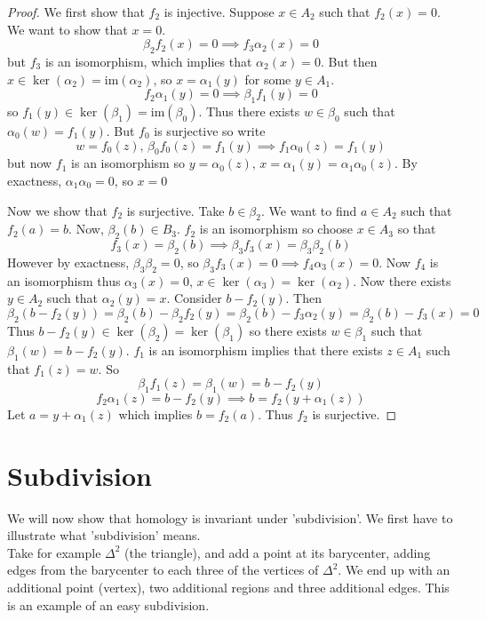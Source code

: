 \documentclass[a4paper,14pt]{extarticle}
\theoremstyle{definition}
\begin{document}
\begin{proof}
	We first show that $f_2$ is injective. Suppose $x\in A_2$ such
	that $f_2(x)=0$. We want to show that $x=0$.
	\[\beta_2 f_2(x)=0\implies f_3\alpha_2(x)=0\]
	but $f_3$ is an isomorphism, which implies that $\alpha_2(x)=0$.
	But then $x\in\ker(\alpha_2)=\text{im}(\alpha_2)$, so $x=\alpha_1(y)$
	for some $y\in A_1$. \[f_2\alpha_1(y)=0\implies \beta_1 f_1(y)=0\]
	so $f_1(y)\in\ker(\beta_1)=\text{im}(\beta_0)$.
	Thus there exists $w\in\beta_0$
	such that $\alpha_0(w)=f_1(y)$. But $f_0$ is surjective so write
	\[w=f_0(z), \,\beta_0 f_0(z)=f_1(y)\implies f_1\alpha_0(z)=f_1(y)\]
	but now $f_1$ is an isomorphism so $y=\alpha_0(z), \,x=\alpha_1(y)=
	\alpha_1\alpha_0(z)$. By exactness, $\alpha_1\alpha_0=0$, so $x=0$

	\vspace{12pt}

	Now we show that $f_2$ is surjective. Take $b\in\beta_2$. We want to find
	$a\in A_2$ such that $f_2(a)=b$. Now, $\beta_2(b)\in B_3$. $f_2$ is an 
	isomorphism so choose $x\in A_3$ so that \[f_3(x)=\beta_2(b)
	\implies \beta_3 f_3(x)=\beta_3\beta_2(b)\] However by exactness,
	$\beta_3\beta_2=0$, so $\beta_3f_3(x)=0\implies f_4\alpha_3(x)=0$.
	Now $f_4$ is an isomorphism thus $\alpha_3(x)=0$, $x\in\ker(\alpha_3)
	=\ker(\alpha_2)$. Now there exists $y\in A_2$ such that $\alpha_2(y)=x$.
	Consider $b-f_2(y)$. Then \[\beta_2(b-f_2(y))=\beta_2(b)-\beta_2f_2(y)
	=\beta_2(b)-f_3\alpha_2(y)=\beta_2(b)-f_3(x)=0\] Thus
	$b-f_2(y)\in\ker(\beta_2)=\ker(\beta_1)$ so there exists $w\in\beta_1$
	such that $\beta_1(w)=b-f_2(y)$. $f_1$ is an isomorphism implies that
	there exists $z\in A_1$ such that $f_1(z)=w$. So \[\beta_1f_1(z)=\beta_1(w)=b-f_2(y)\]
	\[f_2\alpha_1(z)=b-f_2(y)\implies b=f_2(y+\alpha_1(z))\]
	Let $a=y+\alpha_1(z)$ which implies $b=f_2(a)$. Thus $f_2$ is surjective.
\end{proof}

\section{Subdivision}
We will now show that homology is invariant under 'subdivision'. We first have to illustrate
what 'subdivision' means. \\

Take for example $\Delta^2$ (the triangle), and add a point at its barycenter,
adding edges from the barycenter to each three of the vertices of $\Delta^2$.
We end up with an additional point (vertex), two additional regions and three additional
edges. This is an example of an easy subdivision.
\end{document}
